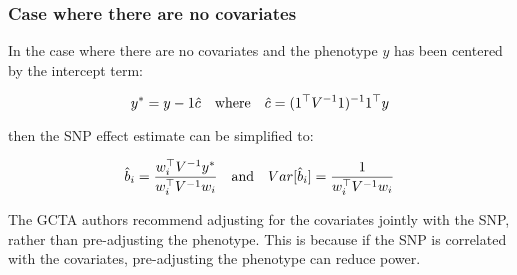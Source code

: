 \documentclass[12pt]{article}
\begin{document}
\subsubsection{Case where there are no covariates}

In the case where there are no covariates and the phenotype $y$ has been centered by the intercept term:

\begin{equation*}
    y^* = y - 1 \hat{c}
    \quad\mathrm{where}\quad
    \hat{c} = (1^{\operatorname*{\top}} V^{-1} 1)^{-1} 1^{\operatorname*{\top}} y
\end{equation*}

then the SNP effect estimate can be simplified to:

\begin{equation*}
    \hat{b}_i = \frac{w_i^{\operatorname*{\top}} V^{-1} y^*}{w_i^{\operatorname*{\top}} V^{-1} w_i}
    \quad\mathrm{and}\quad
    Var[\hat{b}_i] = \frac{1}{w_i^{\operatorname*{\top}} V^{-1} w_i}
\end{equation*}

The GCTA authors recommend adjusting for the covariates jointly with the SNP, rather than pre-adjusting the phenotype. This is because if the SNP is correlated with the covariates, pre-adjusting the phenotype can reduce power.
\end{document}
